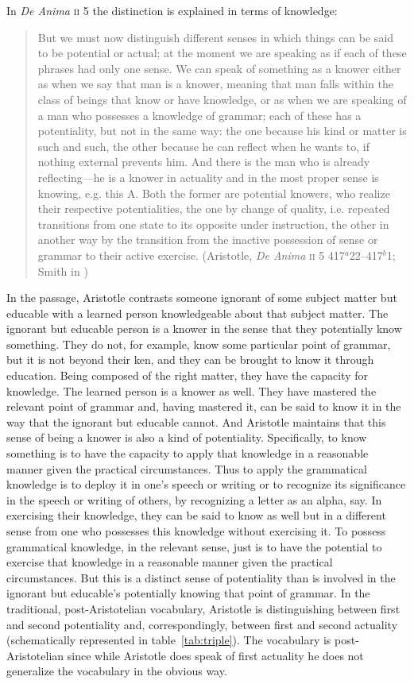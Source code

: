 In \emph{De Anima} \textsc{ii} 5 the distinction is explained in terms of knowledge:
\begin{quote}
	But we must now distinguish different senses in which things can be said to be potential or actual; at the moment we are speaking as if each of these phrases had only one sense. We can speak of something as a knower either as when we say that man is a knower, meaning that man falls within the class of beings that know or have knowledge, or as when we are speaking of a man who possesses a knowledge of grammar; each of these has a potentiality, but not in the same way: the one because his kind or matter is such and such, the other because he can reflect when he wants to, if nothing external prevents him. And there is the man who is already reflecting---he is a knower in actuality and in the most proper sense is knowing, e.g. this A. Both the former are potential knowers, who realize their respective potentialities, the one by change of quality, i.e. repeated transitions from one state to its opposite under instruction, the other in another way by the transition from the inactive possession of sense or grammar to their active exercise. (Aristotle, \emph{De Anima} \textsc{ii} 5 417\( ^{a} \)22--417\( ^{b} \)1; Smith in \citealt[30]{Barnes:1984uq})
\end{quote}

In the passage, Aristotle contrasts someone ignorant of some subject matter but educable with a learned person knowledgeable about that subject matter. The ignorant but educable person is a knower in the sense that they potentially know something. They do not, for example, know some particular point of grammar, but it is not beyond their ken, and they can be brought to know it through education. Being composed of the right matter, they have the capacity for knowledge. The learned person is a knower as well. They have mastered the relevant point of grammar and, having mastered it, can be said to know it in the way that the ignorant but educable cannot. And Aristotle maintains that this sense of being a knower is also a kind of potentiality. Specifically, to know something is to have the capacity to apply that knowledge in a reasonable manner given the practical circumstances. Thus to apply the grammatical knowledge is to deploy it in one's speech or writing or to recognize its significance in the speech or writing of others, by recognizing a letter as an alpha, say. In exercising their knowledge, they can be said to know as well but in a different sense from one who possesses this knowledge without exercising it. To possess grammatical knowledge, in the relevant sense, just is to have the potential to exercise that knowledge in a reasonable manner given the practical circumstances. But this is a distinct sense of potentiality than is involved in the ignorant but educable's potentially knowing that point of grammar.  In the traditional, post-Aristotelian vocabulary, Aristotle is distinguishing between first and second potentiality and, correspondingly, between first and second actuality (schematically represented in table~\ref{tab:triple}). The vocabulary is post-Aristotelian since while Aristotle does speak of first actuality he does not generalize the vocabulary in the obvious way.


